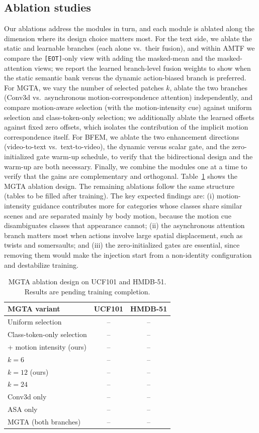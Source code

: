\subsection{Ablation studies}
\label{sec:ablation}
Our ablations address the modules in turn, and each module is ablated along the dimension where its design choice matters most.
For the text side, we ablate the static and learnable branches (each alone vs.\ their fusion), and within AMTF we compare the \texttt{[EOT]}-only view with adding the masked-mean and the masked-attention views; we report the learned branch-level fusion weights to show when the static semantic bank versus the dynamic action-biased branch is preferred.
For MGTA, we vary the number of selected patches $k$, ablate the two branches (Conv3d vs.\ asynchronous motion-correspondence attention) independently, and compare motion-aware selection (with the motion-intensity cue) against uniform selection and class-token-only selection; we additionally ablate the learned offsets against fixed zero offsets, which isolates the contribution of the implicit motion correspondence itself.
For BFEM, we ablate the two enhancement directions (video-to-text vs.\ text-to-video), the dynamic versus scalar gate, and the zero-initialized gate warm-up schedule, to verify that the bidirectional design and the warm-up are both necessary.
Finally, we combine the modules one at a time to verify that the gains are complementary and orthogonal.
Table~\ref{tab:ablation-sata} shows the MGTA ablation design. The remaining ablations follow the same structure (tables to be filled after training).
The key expected findings are: (i) motion-intensity guidance contributes more for categories whose classes share similar scenes and are separated mainly by body motion, because the motion cue disambiguates classes that appearance cannot; (ii) the asynchronous attention branch matters most when actions involve large spatial displacement, such as twists and somersaults; and (iii) the zero-initialized gates are essential, since removing them would make the injection start from a non-identity configuration and destabilize training.

\begin{table}[t]
  \centering
  \begin{tabular}{lcc}
    \hline
    MGTA variant & UCF101 & HMDB-51 \\
    \hline
    Uniform selection & -- & -- \\
    Class-token-only selection & -- & -- \\
    + motion intensity (ours) & -- & -- \\
    $k=6$ & -- & -- \\
    $k=12$ (ours) & -- & -- \\
    $k=24$ & -- & -- \\
    Conv3d only & -- & -- \\
    ASA only & -- & -- \\
    MGTA (both branches) & -- & -- \\
    \hline
  \end{tabular}
  \caption{MGTA ablation design on UCF101 and HMDB-51. Results are pending training completion.}
  \label{tab:ablation-sata}
\end{table}

